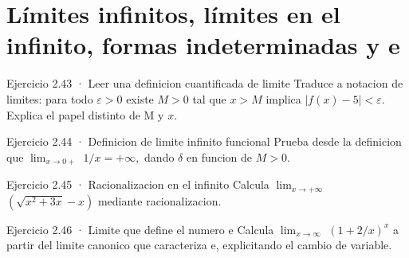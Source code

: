 \documentclass[10pt,a4paper,oneside,openany]{book}
\begin{document}
\section{Límites infinitos, límites en el infinito, formas indeterminadas y e}
\begin{PSevenExerciseFixed}{Ejercicio 2.43 · Leer una definicion cuantificada de limite}
Traduce a notacion de limites: para todo \(\varepsilon >0\) existe \(M>0\) tal que \(x>M\) implica \(|f(x)-5|<\varepsilon \). Explica el papel distinto de M y \(x\).
\end{PSevenExerciseFixed}
\begin{PSevenExerciseFixed}{Ejercicio 2.44 · Definicion de limite infinito funcional}
Prueba desde la definicion que \(\lim_{x\to 0+}\) \(1/x=+\infty ,\) dando \(\delta \) en funcion de \(M>0\).
\end{PSevenExerciseFixed}
\begin{PSevenExerciseFixed}{Ejercicio 2.45 · Racionalizacion en el infinito}
Calcula \(\lim_{x\to +\infty }\) \((\sqrt{x^{2}+3x}-x)\) mediante racionalizacion.
\end{PSevenExerciseFixed}
\begin{PSevenExerciseFixed}{Ejercicio 2.46 · Limite que define el numero e}
Calcula \(\lim_{x\to \infty }\) \((1+2/x)^x\) a partir del limite canonico que caracteriza e, explicitando el cambio de variable.
\end{PSevenExerciseFixed}
\end{document}
